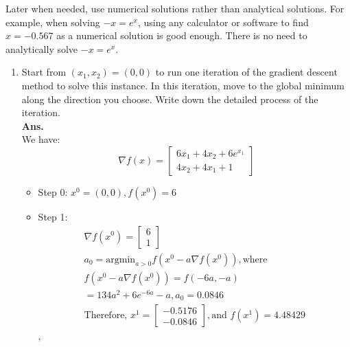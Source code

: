 \documentclass[12pt]{article}
\begin{document}
\begin{enumerate}
            Later when needed, use numerical solutions rather than analytical solutions. For example, when solving $-x = e^x$, using any calculator or software to find $x = -0.567$ as a numerical solution is good enough. There is no need to analytically solve $-x = e^x$.
            \begin{enumerate}
                  \item Start from $(x_1,x_2) = (0,0)$ to run one iteration of the gradient descent method to solve this instance. In this iteration, move to the global minimum along the direction you choose. Write down the detailed process of the iteration.\\
                        \textbf{Ans.}\\
                        We have:
                        \begin{equation*}
                              \nabla f(x) = \begin{bmatrix}
                                    6x_1+4x_2 + 6e^{x_1} \\
                                    4x_2+ 4x_1+1
                              \end{bmatrix}
                        \end{equation*}
                        \begin{itemize}
                              \item Step 0: $x^0 = (0,0), f(x^0) = 6$
                              \item Step 1:
                                    \begin{align*}
                                           & \nabla f(x^0) = \begin{bmatrix}
                                                                   6 \\
                                                                   1
                                                             \end{bmatrix}
                                           &                                                                        \\
                                           & a_0 =           \text{argmin}_{a>0}f(x^0-a\nabla f(x^0)),\text{where } \\
                                           & f(x^0-a\nabla f(x^0)) = f(-6a,-a)                                      \\
                                           & = 134a^2+6e^{-6a}-a, a_0=0.0846\\
                                           & \text{Therefore, } x^1 = \begin{bmatrix}
                                                -0.5176\\
                                                -0.0846
                                           \end{bmatrix}, \text{and }f(x^1) = 4.48429
                                    \end{align*},
                                    

\end{itemize}
\end{enumerate}
\end{enumerate}
\end{document}
